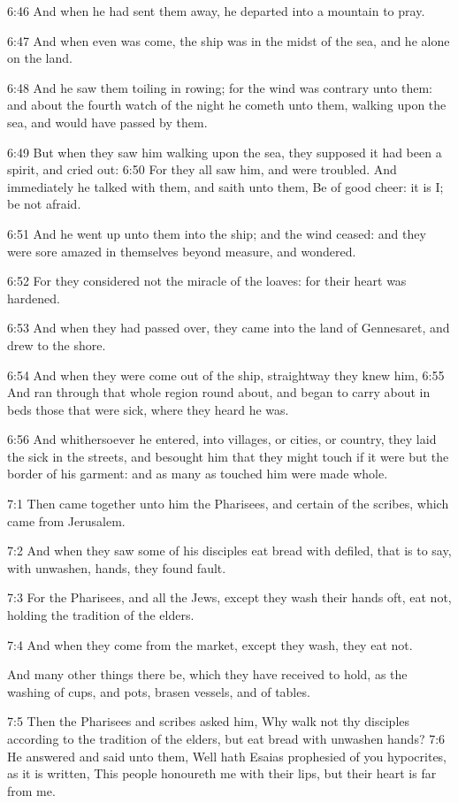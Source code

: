6:46 And when he had sent them away, he departed into a mountain to pray.

6:47 And when even was come, the ship was in the midst of the sea, and he alone on the land.

6:48 And he saw them toiling in rowing; for the wind was contrary unto them: and about the fourth watch of the night he cometh unto them, walking upon the sea, and would have passed by them.

6:49 But when they saw him walking upon the sea, they supposed it had been a spirit, and cried out: 6:50 For they all saw him, and were troubled. And immediately he talked with them, and saith unto them, Be of good cheer: it is I; be not afraid.

6:51 And he went up unto them into the ship; and the wind ceased: and they were sore amazed in themselves beyond measure, and wondered.

6:52 For they considered not the miracle of the loaves: for their heart was hardened.

6:53 And when they had passed over, they came into the land of Gennesaret, and drew to the shore.

6:54 And when they were come out of the ship, straightway they knew him, 6:55 And ran through that whole region round about, and began to carry about in beds those that were sick, where they heard he was.

6:56 And whithersoever he entered, into villages, or cities, or country, they laid the sick in the streets, and besought him that they might touch if it were but the border of his garment: and as many as touched him were made whole.

7:1 Then came together unto him the Pharisees, and certain of the scribes, which came from Jerusalem.

7:2 And when they saw some of his disciples eat bread with defiled, that is to say, with unwashen, hands, they found fault.

7:3 For the Pharisees, and all the Jews, except they wash their hands oft, eat not, holding the tradition of the elders.

7:4 And when they come from the market, except they wash, they eat not.

And many other things there be, which they have received to hold, as the washing of cups, and pots, brasen vessels, and of tables.

7:5 Then the Pharisees and scribes asked him, Why walk not thy disciples according to the tradition of the elders, but eat bread with unwashen hands?  7:6 He answered and said unto them, Well hath Esaias prophesied of you hypocrites, as it is written, This people honoureth me with their lips, but their heart is far from me.

